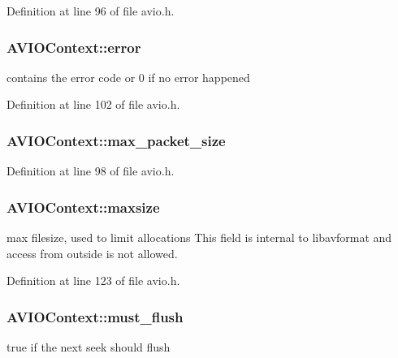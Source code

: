 Definition at line 96 of file avio.\+h.

\subsubsection[{\texorpdfstring{error}{error}}]{ A\+V\+I\+O\+Context\+::error}\hypertarget{struct_a_v_i_o_context_afb903b1d9614bfb59e8cc5213de3777b}{}\label{struct_a_v_i_o_context_afb903b1d9614bfb59e8cc5213de3777b}
contains the error code or 0 if no error happened 

Definition at line 102 of file avio.\+h.

\subsubsection[{\texorpdfstring{max\+\_\+packet\+\_\+size}{max_packet_size}}]{ A\+V\+I\+O\+Context\+::max\+\_\+packet\+\_\+size}\hypertarget{struct_a_v_i_o_context_aca19990941933d7573a485851c6b798e}{}\label{struct_a_v_i_o_context_aca19990941933d7573a485851c6b798e}


Definition at line 98 of file avio.\+h.

\subsubsection[{\texorpdfstring{maxsize}{maxsize}}]{ A\+V\+I\+O\+Context\+::maxsize}\hypertarget{struct_a_v_i_o_context_a33e387aeb28b7a352c62ba8c30a214e7}{}\label{struct_a_v_i_o_context_a33e387aeb28b7a352c62ba8c30a214e7}
max filesize, used to limit allocations This field is internal to libavformat and access from outside is not allowed. 

Definition at line 123 of file avio.\+h.

\subsubsection[{\texorpdfstring{must\+\_\+flush}{must_flush}}]{ A\+V\+I\+O\+Context\+::must\+\_\+flush}\hypertarget{struct_a_v_i_o_context_a06e6f0186fcf571355cee82e837dc339}{}\label{struct_a_v_i_o_context_a06e6f0186fcf571355cee82e837dc339}
true if the next seek should flush 

